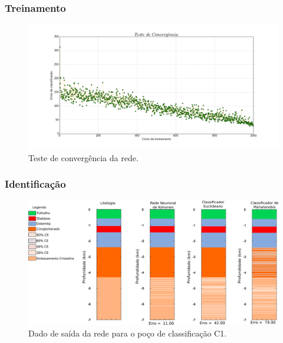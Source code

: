 \documentclass[aspectratio=10]{beamer} %
\begin{document}
\begin{frame}
\frametitle{Treinamento}
\begin{figure}[H]
\centering
\includegraphics[scale=0.2]{Imagens/conv070917.png}
\caption{Teste de convergência da rede.}
\label{convergencia}
\end{figure} 
\end{frame}


\begin{frame}
\frametitle{Identificação}
\begin{figure}[H]
\centering
\includegraphics[scale=0.3]{Imagens/IDC1020118.png}
\caption{Dado de saída da rede para o poço de classificação C1.}
\label{Class C1}
\end{figure} 
\end{frame}
\end{document}
